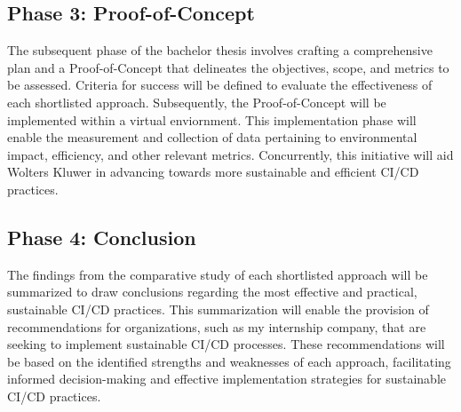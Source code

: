 \subsection{Phase 3: Proof-of-Concept}
The subsequent phase of the bachelor thesis involves crafting a comprehensive plan and a Proof-of-Concept that delineates the objectives, scope, and metrics to be assessed. Criteria for success will be defined to evaluate the effectiveness of each shortlisted approach. Subsequently, the Proof-of-Concept will be implemented within a virtual enviornment. This implementation phase will enable the measurement and collection of data pertaining to environmental impact, efficiency, and other relevant metrics. Concurrently, this initiative will aid Wolters Kluwer in advancing towards more sustainable and efficient CI/CD practices.

\subsection{Phase 4: Conclusion}
The findings from the comparative study of each shortlisted approach will be summarized to draw conclusions regarding the most effective and practical, sustainable CI/CD practices. This summarization will enable the provision of recommendations for organizations, such as my internship company, that are seeking to implement sustainable CI/CD processes. These recommendations will be based on the identified strengths and weaknesses of each approach, facilitating informed decision-making and effective implementation strategies for sustainable CI/CD practices.

